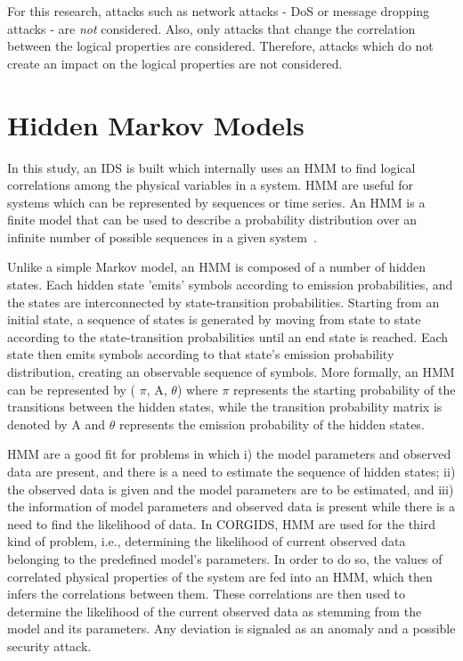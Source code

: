 For this research, attacks such as network attacks - \ac{DoS} or message dropping attacks - are \textit{not} considered. Also, only attacks that change the correlation between the logical properties are considered. Therefore, attacks which do not create an impact on the logical properties are not considered. 

\section{Hidden Markov Models}
\label{sec:HMM_explain}

In this study, an \ac{IDS} is built which internally uses an \ac{HMM} to find logical correlations among the physical variables in a system. \ac{HMM} are useful for systems which can be represented by sequences or time series. An \ac{HMM} is a finite model that can be used to describe a probability distribution over an infinite number of possible sequences in a given system~\cite{eddy1996hidden}.

Unlike a simple Markov model, an \ac{HMM} is composed of a number of hidden states. Each hidden state 'emits' symbols according to emission probabilities, and the states are interconnected by state-transition probabilities. Starting from an initial state, a sequence of states is generated by moving from state to state according to the state-transition probabilities until an end state is reached. Each state then emits symbols according to that state's emission probability distribution, creating an observable sequence of symbols.
More formally, an \ac{HMM} can be represented by ( $\pi$, A, $\theta$) where $\pi$ represents the starting probability of the transitions between the hidden states, while the transition probability matrix is denoted by A and $\theta$ represents the emission probability of the hidden states.

\ac{HMM} are a good fit for problems in which i) the model parameters and observed data are present, and there is a need to estimate the sequence of hidden states; ii) the observed data is given and the model parameters are to be estimated, and iii) the information of model parameters and observed data is present while there is a need to find the likelihood of data. In \ac{CORGIDS}, \ac{HMM} are used for the third kind of problem, i.e., determining the likelihood of current observed data belonging to the predefined model's parameters. In order to do so, the values of correlated physical properties of the system are fed into an \ac{HMM}, which then infers the correlations between them. These correlations are then used to determine the likelihood of the current observed data as stemming from the model and its parameters. Any deviation is signaled as an anomaly and a possible security attack.

